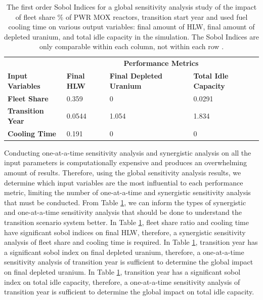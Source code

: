     \begin{table}[]
        \centering
        \doublespacing
        \caption{The first order Sobol Indices for a global sensitivity analysis study of the impact of 
        fleet share \% of PWR MOX reactors, transition start year and used fuel cooling time on various output
        variables: final amount of HLW, final amount of depleted uranium, and total 
        idle capacity in the simulation. The Sobol Indices are only comparable within each column, 
        not within each row \cite{chee_arfc/dcwrapper_2019}.}
        \label{tab:sobol}
            \small
            \begin{tabular}{l||lll}
                \hline	
                & \multicolumn{3}{c}{\textbf{Performance Metrics}} \\ \cline{2-4}
                \textbf{Input Variables} & \textbf{Final HLW} & \textbf{Final Depleted Uranium} & \textbf{Total Idle Capacity} \\ \hline
                \textbf{Fleet Share} & 0.359     & 0                      & 0.0291             \\
                \textbf{Transition Year} & 0.0544     & 1.054                  & 1.834               \\
                \textbf{Cooling Time}  & 0.191     & 0                      & 0                   \\ \hline

            \end{tabular}
    \end{table}

Conducting one-at-a-time sensitivity analysis and synergistic analysis on all 
the input parameters is computationally expensive and produces an overwhelming amount 
of results. 
Therefore, using the global sensitivity analysis results, we determine which 
input variables are the most influential to each performance metric, limiting 
the number of one-at-a-time and synergistic sensitivity analysis that must be 
conducted. 
From Table \ref{tab:sobol}, we can inform the types of synergistic and one-at-a-time 
sensitivity analysis that should be done 
to understand the transition scenario system better.
In Table \ref{tab:sobol}, fleet share ratio and cooling time have significant 
sobol indices on final HLW, therefore, a synergistic sensitivity analysis of fleet 
share and cooling time is required. 
In Table \ref{tab:sobol}, transition year has a significant sobol index on final 
depleted uranium, therefore, a one-at-a-time sensitivity analysis of transition 
year is sufficient to determine the global impact on final depleted uranium. 
In Table \ref{tab:sobol}, transition year has a significant sobol index on total 
idle capacity, therefore, a one-at-a-time sensitivity analysis of transition 
year is sufficient to determine the global impact on total idle capacity. 

